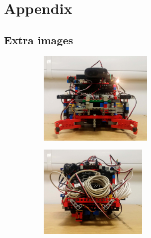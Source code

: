 \appendix

\section{Appendix}


\subsection{Extra images}

\begin{figure}[ht]
    \centering
    \begin{subfigure}{0.45\textwidth}
        \includegraphics[width=\linewidth, height=4.5cm]{res/robot-pics/view-front.jpg}
        \caption{}
        \label{fig:}
    \end{subfigure}
    \begin{subfigure}{0.45\textwidth}
        \includegraphics[width=\linewidth, height=4.5cm]{res/robot-pics/view-back.jpg}
        \caption{}
        \label{fig:}
    \end{subfigure}
    \caption{}
    \label{fig:}
\end{figure}


